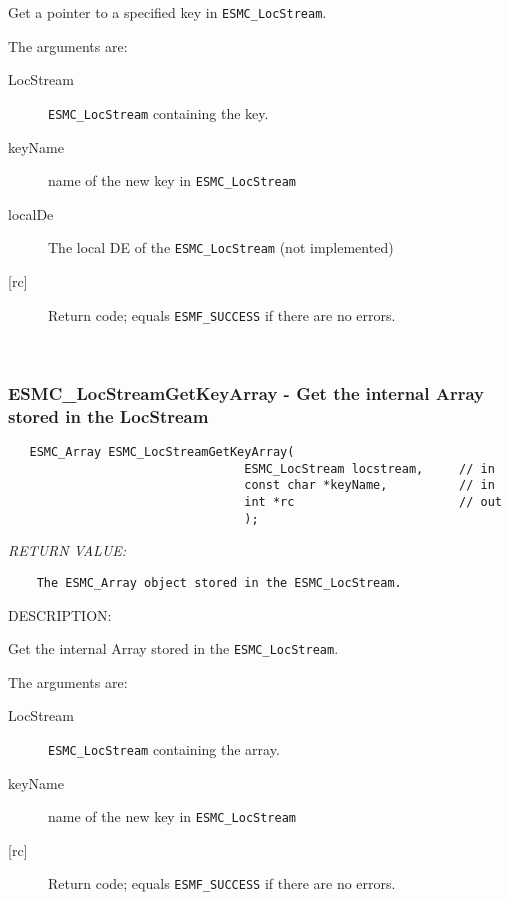   
    Get a pointer to a specified key in {\tt ESMC\_LocStream}.
  
    The arguments are:
    \begin{description}
    \item[LocStream]
      {\tt ESMC\_LocStream} containing the key.
    \item[keyName]
      name of the new key in {\tt ESMC\_LocStream}
    \item[localDe]
      The local DE of the {\tt ESMC\_LocStream} (not implemented)
    \item[{[rc]}]
      Return code; equals {\tt ESMF\_SUCCESS} if there are no errors.
    \end{description}
   
 
\mbox{}\hrulefill\ 
 
\subsubsection [ESMC\_LocStreamGetKeyArray] {ESMC\_LocStreamGetKeyArray - Get the internal Array stored in the LocStream}


  
\begin{verbatim}   ESMC_Array ESMC_LocStreamGetKeyArray(
                                 ESMC_LocStream locstream,     // in
                                 const char *keyName,          // in
                                 int *rc                       // out
                                 );
 \end{verbatim}{\em RETURN VALUE:}
\begin{verbatim}    The ESMC_Array object stored in the ESMC_LocStream.\end{verbatim}
{\sf DESCRIPTION:\\ }


  
    Get the internal Array stored in the {\tt ESMC\_LocStream}.
  
    The arguments are:
    \begin{description}
    \item[LocStream]
      {\tt ESMC\_LocStream} containing the array.
    \item[keyName]
      name of the new key in {\tt ESMC\_LocStream}
    \item[{[rc]}]
      Return code; equals {\tt ESMF\_SUCCESS} if there are no errors.
    \end{description}
   
